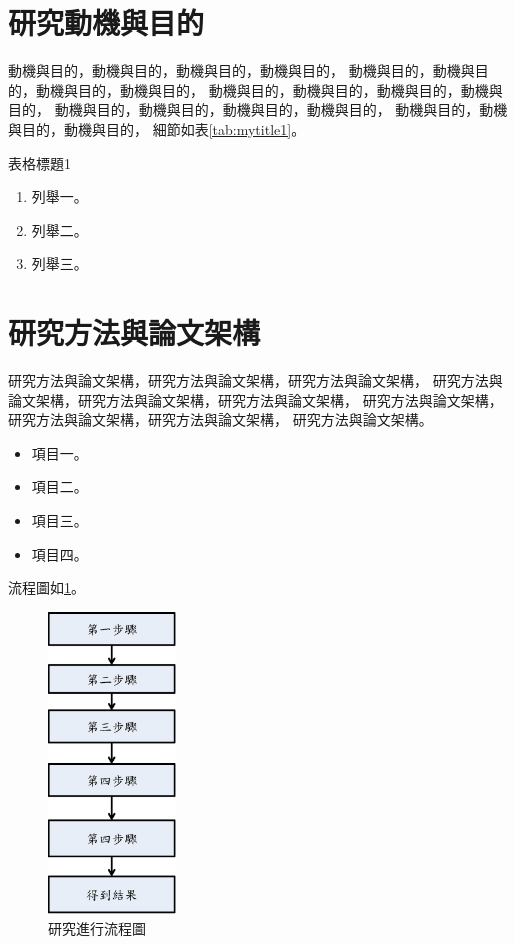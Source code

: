 \section{研究動機與目的}
    動機與目的，動機與目的，動機與目的，動機與目的，
    動機與目的，動機與目的，動機與目的，動機與目的，
    動機與目的，動機與目的，動機與目的，動機與目的，
    動機與目的，動機與目的，動機與目的，動機與目的，
    動機與目的，動機與目的，動機與目的，
    細節如表\ref{tab:mytitle1}。
    \begin{table}[!t]
        \centering
        \caption{表格標題1}
        \label{tab:mytitle1}
        
    \end{table}

    \begin{enumerate}
        \item
        列舉一。
        \item
        列舉二。
        \item
        列舉三。
    \end{enumerate}

\section {研究方法與論文架構}
    研究方法與論文架構，研究方法與論文架構，研究方法與論文架構，
    研究方法與論文架構，研究方法與論文架構，研究方法與論文架構，
    研究方法與論文架構，研究方法與論文架構，研究方法與論文架構，
    研究方法與論文架構。

    \begin{itemize}
        \item
        項目一。
        \item
        項目二。
        \item
        項目三。
        \item
        項目四。
    \end{itemize}

    流程圖如\ref{fig:ResearchFlowChart}。
    \begin{figure}[htbp]
        \centering
        \includegraphics[height=8cm]{graphs/introduction/ResearchFlowChart.eps}
        \caption{研究進行流程圖}
        \label{fig:ResearchFlowChart}
    \end{figure}

